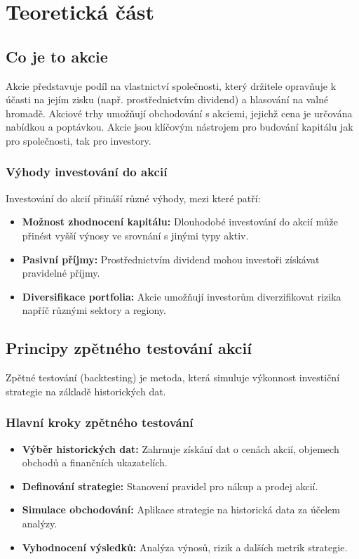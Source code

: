 \documentclass[12pt, a4paper]{report}
\begin{document}
\chapter{Teoretická část}

\section{Co je to akcie}
Akcie představuje podíl na vlastnictví společnosti, který držitele opravňuje k účasti na jejím zisku (např. prostřednictvím dividend) a hlasování na valné hromadě. Akciové trhy umožňují obchodování s akciemi, jejichž cena je určována nabídkou a poptávkou. Akcie jsou klíčovým nástrojem pro budování kapitálu jak pro společnosti, tak pro investory.

\subsection{Výhody investování do akcií}
Investování do akcií přináší různé výhody, mezi které patří:
\begin{itemize}
    \item \textbf{Možnost zhodnocení kapitálu:} Dlouhodobé investování do akcií může přinést vyšší výnosy ve srovnání s jinými typy aktiv.
    \item \textbf{Pasivní příjmy:} Prostřednictvím dividend mohou investoři získávat pravidelné příjmy.
    \item \textbf{Diversifikace portfolia:} Akcie umožňují investorům diverzifikovat rizika napříč různými sektory a regiony.
\end{itemize}

\section{Principy zpětného testování akcií}
Zpětné testování (backtesting) je metoda, která simuluje výkonnost investiční strategie na základě historických dat.

\subsection{Hlavní kroky zpětného testování}
\begin{itemize}
    \item \textbf{Výběr historických dat:} Zahrnuje získání dat o cenách akcií, objemech obchodů a finančních ukazatelích.
    \item \textbf{Definování strategie:} Stanovení pravidel pro nákup a prodej akcií.
    \item \textbf{Simulace obchodování:} Aplikace strategie na historická data za účelem analýzy.
    \item \textbf{Vyhodnocení výsledků:} Analýza výnosů, rizik a dalších metrik strategie.
\end{itemize}
\end{document}
